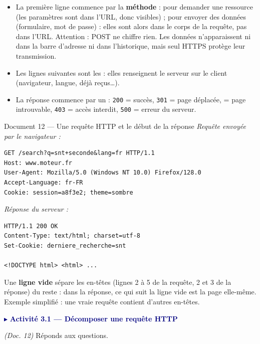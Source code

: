 \documentclass[11pt,a4paper]{article}
\newif\ifprof
\newcommand{\trou}[2][3cm]{\ifprof\textcolor{corr}{\underline{\textbf{\,#2\,}}}\else\underline{\hspace{#1}}\fi}
\newcommand{\activite}[1]{%
  \Needspace{6\baselineskip}%
  \begin{tcolorbox}[enhanced,colback=bleuclair,colframe=navy!70,boxrule=0.5pt,arc=3pt,
    left=6pt,top=3pt,bottom=3pt,before skip=10pt,after skip=6pt]
  \textcolor{navy}{$\blacktriangleright$ \textbf{#1}}\end{tcolorbox}}
\begin{document}
\begin{itemize}
\item La première ligne commence par la \textbf{méthode} : \trou[1.5cm]{GET} pour demander une ressource (les paramètres sont dans l'URL, donc visibles) ; \trou[1.5cm]{POST} pour envoyer des données (formulaire, mot de passe) : elles sont alors dans le corps de la requête, pas dans l'URL. Attention : POST ne chiffre rien. Les données n'apparaissent ni dans la barre d'adresse ni dans l'historique, mais seul HTTPS protège leur transmission.
\item Les lignes suivantes sont les \trou[2.5cm]{en-têtes} : elles renseignent le serveur sur le client (navigateur, langue, \trou[2cm]{cookies} déjà reçus…).
\item La réponse commence par un \trou[2cm]{code} : \texttt{200} = succès, \texttt{301} = page déplacée, \trou[1.5cm]{404} = page introuvable, \texttt{403} = accès interdit, \texttt{500} = erreur du serveur.
\end{itemize}

\begin{docbox}{Document 12 — Une requête HTTP et le début de la réponse}
\textit{Requête envoyée par le navigateur :}
\begin{Verbatim}[fontsize=\scriptsize,xleftmargin=10pt]
GET /search?q=snt+seconde&lang=fr HTTP/1.1
Host: www.moteur.fr
User-Agent: Mozilla/5.0 (Windows NT 10.0) Firefox/128.0
Accept-Language: fr-FR
Cookie: session=a8f3e2; theme=sombre

\end{Verbatim}
\textit{Réponse du serveur :}
\begin{Verbatim}[fontsize=\scriptsize,xleftmargin=10pt]
HTTP/1.1 200 OK
Content-Type: text/html; charset=utf-8
Set-Cookie: derniere_recherche=snt

<!DOCTYPE html> <html> ...
\end{Verbatim}
{\footnotesize Une \textbf{ligne vide} sépare les en-têtes (lignes 2 à 5 de la requête, 2 et 3 de la réponse) du reste : dans la réponse, ce qui suit la ligne vide est la page elle-même. Exemple simplifié : une vraie requête contient d'autres en-têtes.}
\end{docbox}

\activite{Activité 3.1 — Décomposer une requête HTTP}

\emph{(Doc. 12)} Réponds aux questions.
\end{document}
